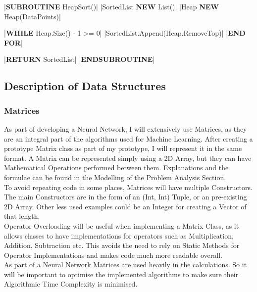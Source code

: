 \begin{flushleft}
                \begin{pseudocode}
|\textbf{SUBROUTINE} HeapSort()|
    |SortedList \leftarrow \textbf{NEW} List()|
    |Heap \leftarrow \textbf{NEW} Heap(DataPoints)|

    |\textbf{WHILE} Heap.Size() - 1 >= 0|
        |SortedList.Append(Heap.RemoveTop)|
    |\textbf{END FOR}|

    |\textbf{RETURN} SortedList|
|\textbf{ENDSUBROUTINE}|
                \end{pseudocode}

                \vspace{0.5cm}
        \vspace{0.5cm}
        \subsection{Description of Data Structures}
            \subsubsection{Matrices}
                As part of developing a Neural Network, I will extensively use Matrices, as they are an integral part of the algorithms
                used for Machine Learning. After creating a prototype Matrix class as part of my prototype, I will represent it in the
                same format. A Matrix can be represented simply using a 2D Array, but they can have Mathematical Operations performed
                between them. Explanations and the formulae can be found in the Modelling of the Problem Analysis Section. \\
                \vspace{0.2cm}
                To avoid repeating code in some places, Matrices will have multiple Constructors. The main Constructors are in the form 
                of an (Int, Int) Tuple, or an pre-existing 2D Array. Other less used examples could be an Integer for creating 
                a Vector of that length. \\
                \vspace{0.2cm}
                Operator Overloading will be useful when implementing a Matrix Class, as it allows classes to have implementations for
                operators such as Multiplication, Addition, Subtraction etc. This avoids the need to rely on Static Methods for Operator
                Implementations and makes code much more readable overall. \\
                \vspace{0.2cm}
                As part of a Neural Network Matrices are used heavily in the calculations. So it will be important to optimise the
                implemented algorithms to make sure their Algorithmic Time Complexity is minimised. \\

\end{flushleft}
